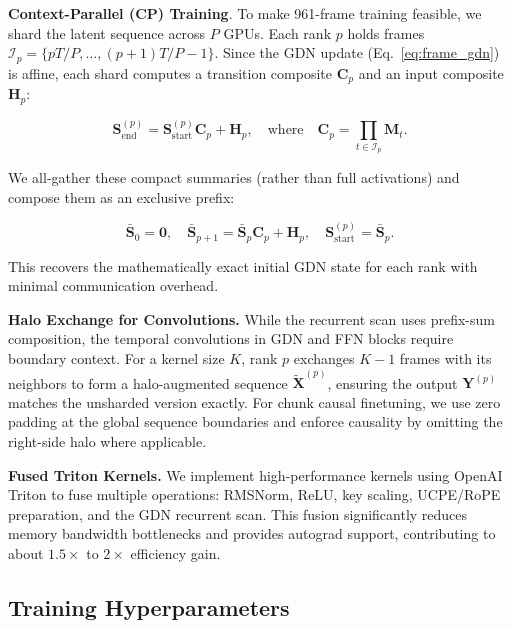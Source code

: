 \noindent \textbf{Context-Parallel (CP) Training}.
To make 961-frame training feasible, we shard the latent sequence across $P$ GPUs. Each rank $p$ holds frames $\mathcal{I}_p=\{pT/P,\ldots,(p{+}1)T/P{-}1\}$. Since the GDN update (Eq.~\ref{eq:frame_gdn}) is affine, each shard computes a transition composite $\mathbf{C}_p$ and an input composite $\mathbf{H}_p$:

\begin{equation}
\mathbf{S}_{\mathrm{end}}^{(p)}=\mathbf{S}_{\mathrm{start}}^{(p)}\mathbf{C}_p+\mathbf{H}_p,
\quad
\text{where}
\quad
\mathbf{C}_p=\prod_{t\in\mathcal{I}_p}\mathbf{M}_t .
\end{equation}

\noindent We all-gather these compact summaries (rather than full activations) and compose them as an exclusive prefix:

\begin{equation}
\bar{\mathbf{S}}_0=\mathbf{0},
\quad
\bar{\mathbf{S}}_{p+1}=\bar{\mathbf{S}}_p\mathbf{C}_p+\mathbf{H}_p,
\quad
\mathbf{S}_{\mathrm{start}}^{(p)}=\bar{\mathbf{S}}_p.
\end{equation}

\noindent This recovers the mathematically exact initial GDN state for each rank with minimal communication overhead.

\noindent \textbf{Halo Exchange for Convolutions.}
While the recurrent scan uses prefix-sum composition, the temporal convolutions in GDN and FFN blocks require boundary context. For a kernel size $K$, rank $p$ exchanges $K-1$ frames with its neighbors to form a halo-augmented sequence $\tilde{\mathbf{X}}^{(p)}$, ensuring the output $\mathbf{Y}^{(p)}$ matches the unsharded version exactly. For chunk causal finetuning, we use zero padding at the global sequence boundaries and enforce causality by omitting the right-side halo where applicable.

\noindent \textbf{Fused Triton Kernels.} We implement high-performance kernels using OpenAI Triton to fuse multiple operations: RMSNorm, ReLU, key scaling, UCPE/RoPE preparation, and the GDN recurrent scan. This fusion significantly reduces memory bandwidth bottlenecks and provides autograd support, contributing to about $1.5\times$ to $2\times$ efficiency gain.

\subsection{Training Hyperparameters}
\label{sec:appendix_training_hyperparams}

